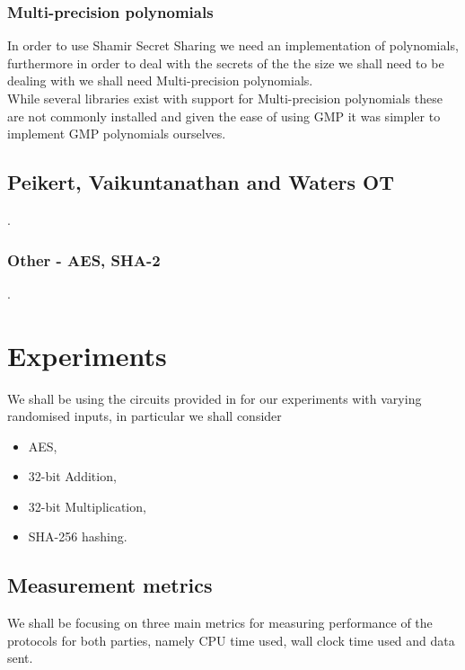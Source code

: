 \documentclass[ %
                    author={Nicholas Tutte},
                supervisor={Prof. Nigel Smart},
                    degree={MEng},
                     title={Secure Two Party Computation},
                  subtitle={A practical comparison of recent protocols},
                      type={Research - GG1K},
                      year={2015} ]{dissertation}
\begin{document}
			\subsection{Multi-precision polynomials}
				In order to use Shamir Secret Sharing we need an implementation of polynomials, furthermore in order to deal with the secrets of the the size we shall need to be dealing with we shall need Multi-precision polynomials.\\
				
				While several libraries exist with support for Multi-precision polynomials these are not commonly installed and given the ease of using GMP it was simpler to implement GMP polynomials ourselves.\\

			

		\section{Peikert, Vaikuntanathan and Waters OT}

			.

		\subsection{Other - AES, SHA-2}

			.


	\chapter{Experiments} \label{sec:Results}
		We shall be using the circuits provided in \cite{NigelCircuits} for our experiments with varying randomised inputs, in particular we shall consider
		
		\begin{itemize}
			\item AES,
			\item 32-bit Addition,
			\item 32-bit Multiplication,
			\item SHA-256 hashing.
		\end{itemize}


		\section{Measurement metrics}
			We shall be focusing on three main metrics for measuring performance of the protocols for both parties, namely CPU time used, wall clock time used and data sent.\\
\end{document}

